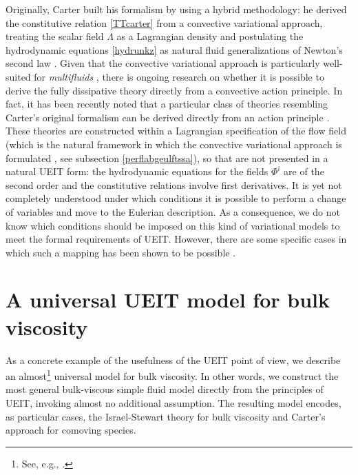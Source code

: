 \documentclass[a4paper, amsfonts, amssymb, amsmath, reprint, twocolumn, showkeys, nofootinbib]{revtex4-2}
\begin{document}
Originally, Carter built his formalism by using a hybrid methodology: he derived the constitutive relation \eqref{TTcarter} from a convective variational approach, treating the scalar field $\Lambda$ as a Lagrangian density and postulating the hydrodynamic equations \eqref{hydrunkz} as natural fluid generalizations of Newton's second law \cite{carter1991,GavassinoRadiazione}. 
Given that the convective variational approach is particularly well-suited for \emph{multifluids} \cite{andersson2007review,Termo}, there is ongoing research on whether it is possible to derive the fully dissipative theory directly from a convective action principle. 
In fact, it has been recently noted  that a particular class of  theories resembling  Carter's original formalism can be derived directly from an action principle \citep{AnderssonComerDissAct2015,CeloraNils2020}. 
These theories are constructed within a Lagrangian specification of the flow field (which is the natural framework in which the convective variational approach is formulated \cite{andersson2007review}, see subsection \ref{perflabgeulftssa}), so that are not  presented in a natural UEIT form: the hydrodynamic equations for the fields $\Phi^i$ are of the second order and the constitutive relations involve first derivatives. 
It is yet not completely understood under which conditions  it is possible to perform a  change of variables and move to the Eulerian description. As a consequence, we do not know which conditions should be imposed on this kind of variational models to meet the formal requirements of UEIT. However, there are some specific cases in which such a mapping has been shown to be possible \citep{Andersson_relativisticplasmas}.


\section{A universal UEIT model for bulk viscosity}


As a concrete example of the usefulness of the UEIT point of view, we describe an almost\footnote{See, e.g.,  \citet{jain_kovtun_2020arXiv}.} universal model for bulk viscosity. In other words, we construct the most general bulk-viscous simple fluid model \citep{BulkGavassino} directly from the principles of UEIT, invoking almost no additional assumption. The resulting model encodes, as particular cases, the Israel-Stewart theory for bulk viscosity and Carter's approach for comoving species. 
\end{document}

